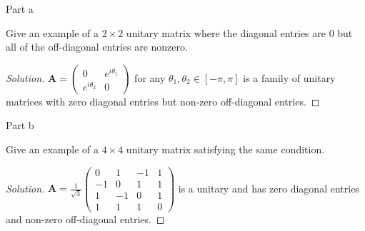 \begin{solution}{Part a}\label{ques:1a}
  \begin{question}
    Give an example of a $2 \times 2$ unitary matrix where the diagonal entries are 0 but all of the off-diagonal entries are nonzero.
  \end{question}
  \tcblower{}
  \begin{proof}[Solution]
    $\mathbf{A} = \begin{pmatrix}
      0 & e^{i\theta_1}\\
      e^{i\theta_2} & 0
    \end{pmatrix}$ for any $\theta_1, \theta_2 \in [-\pi, \pi]$ is a family of unitary matrices with zero diagonal entries but non-zero off-diagonal entries.
  \end{proof}
\end{solution}

\begin{solution}{Part b}\label{ques:1b}
  \begin{question}
    Give an example of a $4 \times 4$ unitary matrix satisfying the same condition.
  \end{question}
  \tcblower{}
  \begin{proof}[Solution]
    $\mathbf{A} = \frac{1}{\sqrt{3}}\begin{pmatrix}
      0 & 1 & -1 & 1\\
      -1 & 0 & 1 & 1\\
      1 & -1 & 0 & 1\\
      1 & 1 & 1 & 0
    \end{pmatrix}$ is a unitary and has zero diagonal entries and non-zero off-diagonal entries.
  \end{proof}
\end{solution}

